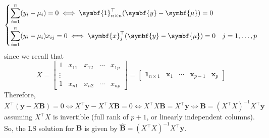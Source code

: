 \[ \begin{dcases}
        \sum\limits_{i=1}^{n} (y_i-\mu_i)=0\iff \symbf{1}_{n\times n}^\top(\symbf{y}-\symbf{\mu})=0 \\
        \sum\limits_{i=1}^{n} (y_i-\mu_i)x_{ij}=0\iff \symbf{x}_{j}^\top
        (\symbf{y}-\symbf{\mu})=0 & j=1,\ldots,p
    \end{dcases} \]
since we recall that
\[ X=\begin{bmatrix}
        1 & x_{11} & x_{12} & \cdots & x_{1p} \\
        \vdots                                \\
        1 & x_{n1} & x_{n2} & \cdots & x_{np}
    \end{bmatrix}=
    \begin{bmatrix}
        \symbf{1}_{n\times 1} & \symbf{x}_1 & \cdots & \symbf{x}_{p-1} & \symbf{x}_p
    \end{bmatrix} \]
Therefore,
\[ X^\top(\symbf{y}-X\symbf{B})=0\iff
    X^\top \symbf{y}-X^\top X\symbf{B}=0\iff
    X^\top X \symbf{B}=X^\top \symbf{y}\iff
    \symbf{B}=(X^\top X)^{-1}X^\top \symbf{y} \]
assuming $ X^\top X $ is invertible (full rank of $ p+1 $, or linearly
independent columns). So, the LS solution for $ \symbf{B} $ is given by
$ \hat{\symbf{B}}=(X^\top X)^{-1}X^\top \symbf{y} $.

